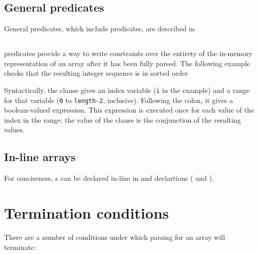 \subsection{General predicates}
General predicates, which include \Pparsecheck{} predicates, are
described in 

\subsection{\Pforall}
\Pforall{} predicates provide a way to write constraints over the entirety
of the in-memory representation of an array after it has been fully
parsed. The following example checks that the resulting integer
sequence is in sorted order

Syntactically, the \Pforall{} clause gives an index variable
(\texttt{i} in the example) and a range for that variable (\texttt{0}
to \texttt{length-2}, inclusive).  Following the colon, it gives a
boolean-valued expression. This expression is executed once for each
value of the index in the range;  the value of the clause is the
conjunction of the resulting values.

\subsection{In-line arrays}
For conciseness, \Parray{}s can be declared in-line in \Pstruct{} and
\Punion{} declartions  (\cf{}  and
).

\section{Termination conditions}
There are a number of conditions under which parsing for an array will
terminate:

